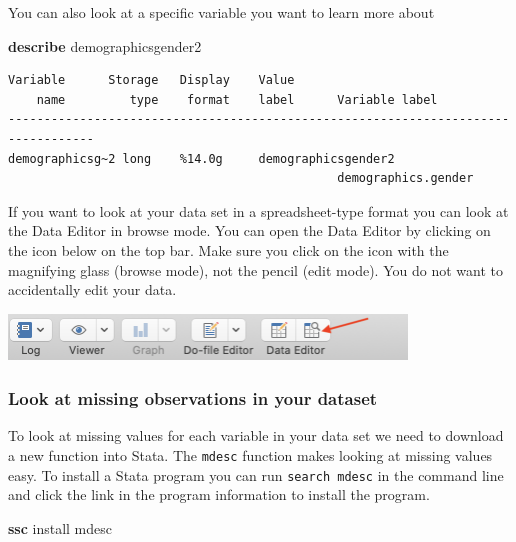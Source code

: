 \documentclass[
]{book}
\newenvironment{Shaded}{\begin{snugshade}}{\end{snugshade}}
\newcommand{\KeywordTok}[1]{\textcolor[rgb]{0.13,0.29,0.53}{\textbf{#1}}}
\newcommand{\NormalTok}[1]{#1}
\begin{document}
You can also look at a specific variable you want to learn more about

\begin{Shaded}
\begin{Highlighting}[]
\KeywordTok{describe}\NormalTok{ demographicsgender2}
\end{Highlighting}
\end{Shaded}

\begin{verbatim}
Variable      Storage   Display    Value
    name         type    format    label      Variable label
----------------------------------------------------------------------------------
demographicsg~2 long    %14.0g     demographicsgender2
                                              demographics.gender
\end{verbatim}

If you want to look at your data set in a spreadsheet-type format you can look at the Data Editor in browse mode. You can open the Data Editor by clicking on the icon below on the top bar. Make sure you click on the icon with the magnifying glass (browse mode), not the pencil (edit mode). You do not want to accidentally edit your data.

\includegraphics[width=4.16667in,height=\textheight]{images/data_editor.png}

\hypertarget{mdesc}{%
\subsubsection*{Look at missing observations in your dataset}\label{mdesc}}

To look at missing values for each variable in your data set we need to download a new function into Stata. The \texttt{mdesc} function makes looking at missing values easy. To install a Stata program you can run \texttt{search\ mdesc} in the command line and click the link in the program information to install the program.

\begin{Shaded}
\begin{Highlighting}[]
\KeywordTok{ssc}\NormalTok{ install mdesc}
\end{Highlighting}
\end{Shaded}
\end{document}
